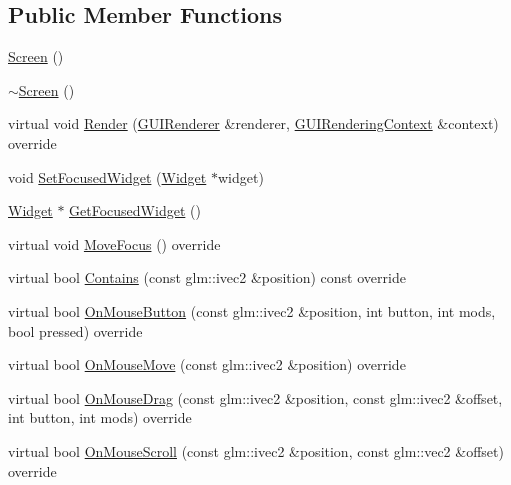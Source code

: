 \subsection*{Public Member Functions}
\begin{DoxyCompactItemize}
\item 
\mbox{\hyperlink{classec__gui_1_1_screen_a70d376c7107983dc3e57f70c2eef3ffa}{Screen}} ()
\item 
\mbox{\hyperlink{classec__gui_1_1_screen_ae31ba095c31a7811bb18b0049511565c}{$\sim$\+Screen}} ()
\item 
virtual void \mbox{\hyperlink{classec__gui_1_1_screen_a8a1e8f2db412a40632c580c547861b52}{Render}} (\mbox{\hyperlink{classec__gui_1_1_g_u_i_renderer}{G\+U\+I\+Renderer}} \&renderer, \mbox{\hyperlink{classec__gui_1_1_g_u_i_rendering_context}{G\+U\+I\+Rendering\+Context}} \&context) override
\item 
void \mbox{\hyperlink{classec__gui_1_1_screen_afad8f0e7494006c1c44953851dc8d9d4}{Set\+Focused\+Widget}} (\mbox{\hyperlink{classec__gui_1_1_widget}{Widget}} $\ast$widget)
\item 
\mbox{\hyperlink{classec__gui_1_1_widget}{Widget}} $\ast$ \mbox{\hyperlink{classec__gui_1_1_screen_af2a3ff2e547e2a1a7bb25ecec1f1a1bf}{Get\+Focused\+Widget}} ()
\item 
virtual void \mbox{\hyperlink{classec__gui_1_1_screen_ad80e3b3a1ea500da673e62675185ff18}{Move\+Focus}} () override
\item 
virtual bool \mbox{\hyperlink{classec__gui_1_1_screen_a99d3e8673ceedf958fd36c470575be65}{Contains}} (const glm\+::ivec2 \&position) const override
\item 
virtual bool \mbox{\hyperlink{classec__gui_1_1_screen_a2d13abce5d8f8e8332f15949db18c374}{On\+Mouse\+Button}} (const glm\+::ivec2 \&position, int button, int mods, bool pressed) override
\item 
virtual bool \mbox{\hyperlink{classec__gui_1_1_screen_a22ba089bf993e921d2d9b8e26f620e52}{On\+Mouse\+Move}} (const glm\+::ivec2 \&position) override
\item 
virtual bool \mbox{\hyperlink{classec__gui_1_1_screen_a79cafedae2faa7090fec46e7ad16efd9}{On\+Mouse\+Drag}} (const glm\+::ivec2 \&position, const glm\+::ivec2 \&offset, int button, int mods) override
\item 
virtual bool \mbox{\hyperlink{classec__gui_1_1_screen_aff591b1b897b9237a3ab734689282c0e}{On\+Mouse\+Scroll}} (const glm\+::ivec2 \&position, const glm\+::vec2 \&offset) override
\item 

\end{DoxyCompactItemize}
